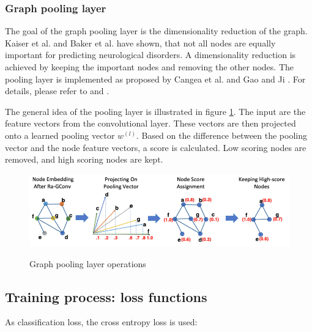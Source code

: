 \subsubsection{Graph pooling layer}
\label{approach:Bb}

The goal of the graph pooling layer is the dimensionality reduction of the graph. Kaiser et al. \cite{doi:10.1073/pnas.1010412107} and Baker et al. \cite{10.1001/jamapsychiatry.2013.3469} have shown, that not all nodes are equally important for predicting neurological disorders. A dimensionality reduction is achieved by keeping the important nodes and removing the other nodes.
The pooling layer is implemented as proposed by Cangea et al. \cite{https://doi.org/10.48550/arxiv.1811.01287} and Gao and Ji \cite{pmlr-v97-gao19a}. For details, please refer to \cite{https://doi.org/10.48550/arxiv.1811.01287} and \cite{pmlr-v97-gao19a}.

The general idea of the pooling layer is illustrated in figure \ref{fig:pooling}. The input are the feature vectors from the convolutional layer. These vectors are then projected onto a learned pooling vector $w^{(l)}$. Based on the difference between the pooling vector and the node feature vectors, a score is calculated. Low scoring nodes are removed, and high scoring nodes are kept.

\begin{figure}[ht]
	\centering
	\includegraphics[width=1.0\linewidth]{figures/pooling.png}
	\caption{Graph pooling layer operations}
	\cite{LI2021102233}
	\label{fig:pooling}
\end{figure}





\subsection{Training process: loss functions}
\label{approach:C}

As classification loss, the cross entropy loss is used:


